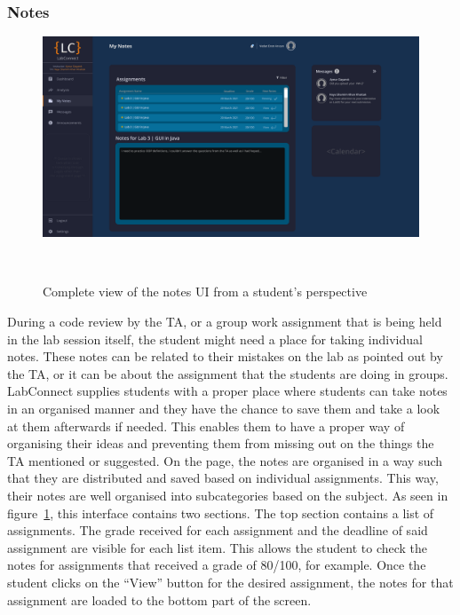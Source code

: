 \documentclass[a4paper, 12pt]{article}
\begin{document}
    \subsubsection{Notes}

    \begin{figure}[H]
        \centering
        \includegraphics[width=\textwidth]{student_notes}
        \caption{Complete view of the notes UI from a student's perspective}~\label{fig:student_notes_full}
    \end{figure}

    During a code review by the TA, or a group work assignment that is being held in the lab session itself,
    the student might need a place for taking individual notes. These notes can be related to their
    mistakes on the lab as pointed out by the TA, or it can be about the assignment that the
    students are doing in groups. LabConnect supplies students with a proper place where students
    can take notes in an organised manner and they have the chance to save them and take a look
    at them afterwards if needed. This enables them to have a proper way of organising their ideas
    and preventing them from missing out on the things the TA mentioned or suggested. On the
    page, the notes are organised in a way such that they are distributed and saved based on individual
    assignments. This way, their notes are well organised into subcategories
    based on the subject. As seen in figure~\ref{fig:student_notes_full}, this interface contains
    two sections. The top section contains a list of assignments. The grade received for each
    assignment and the deadline of said assignment are visible for each list item. This allows the
    student to check the notes for assignments that received a grade of 80/100, for example. Once
    the student clicks on the ``View'' button for the desired assignment, the notes for that assignment
    are loaded to the bottom part of the screen.
\end{document}
